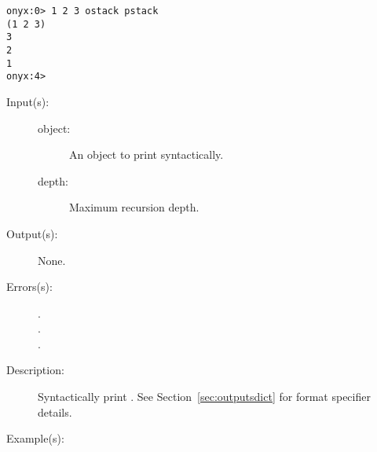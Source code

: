 \begin{description}
\begin{description}
\begin{verbatim}
onyx:0> 1 2 3 ostack pstack
(1 2 3)
3
2
1
onyx:4>
		\end{verbatim}
	\end{description}
\label{systemdict:output}
\item[{\onyxop{object depth}{output}{--}}: ]
	\begin{description}\item[]
	\item[Input(s): ]
		\begin{description}\item[]
		\item[object: ]
			An object to print syntactically.
		\item[depth: ]
			Maximum recursion depth.
		\end{description}
	\item[Output(s): ] None.
	\item[Errors(s): ]
		\begin{description}\item[]
		\item[.]
		\item[.]
		\item[.]
		\end{description}
	\item[Description: ]
		Syntactically print .  See
		Section~\ref{sec:outputsdict} for format specifier details.
	\item[Example(s): ]\begin{verbatim}


\end{verbatim}
\end{description}
\end{description}
